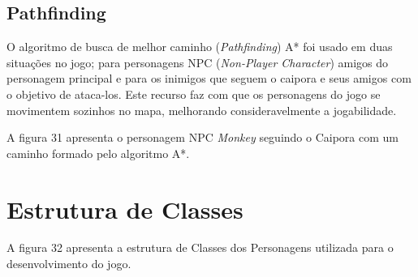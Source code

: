	
	
\subsection{Pathfinding}
O algoritmo de busca de melhor caminho (\textit{Pathfinding}) A* foi usado em duas situações no jogo; para personagens NPC (\textit{Non-Player Character}) amigos do personagem principal e para os inimigos que seguem o caipora e seus amigos com o objetivo de ataca-los.  Este recurso faz com que os personagens do jogo se movimentem sozinhos no mapa, melhorando consideravelmente a jogabilidade.


A figura 31 apresenta o personagem NPC \textit{Monkey} seguindo o Caipora com um caminho formado pelo algoritmo A*.

\begin{figure}[h!]
		\centering
	\end{figure}
	

	\section{Estrutura de Classes}
	A figura 32 apresenta a estrutura de Classes dos Personagens utilizada para o desenvolvimento do jogo.
	
